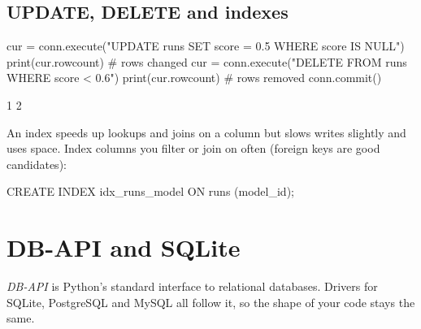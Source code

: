 \begin{center}
\end{center}

\subsection{UPDATE, DELETE and indexes}

\begin{pycode}
cur = conn.execute("UPDATE runs SET score = 0.5 WHERE score IS NULL")
print(cur.rowcount)                      # rows changed
cur = conn.execute("DELETE FROM runs WHERE score < 0.6")
print(cur.rowcount)                      # rows removed
conn.commit()
\end{pycode}
\begin{rawcode}
1
2
\end{rawcode}

An index speeds up lookups and joins on a column but slows writes slightly and uses
space. Index columns you filter or join on often (foreign keys are good candidates):

\begin{rawcode}
CREATE INDEX idx_runs_model ON runs (model_id);
\end{rawcode}

\section{DB-API and SQLite}

\emph{DB-API} is Python's standard interface to relational databases. Drivers for SQLite,
PostgreSQL and MySQL all follow it, so the shape of your code stays the same.

